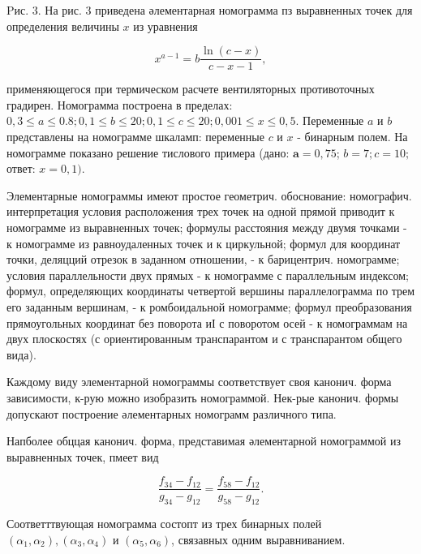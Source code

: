 \documentclass[10pt]{article}
\begin{document}
Pис. 3. На рис. 3 приведена әлементарная номограмма пз выравненных точек для определения величины $x$ из уравнения



\[

x^{a-1}=b \frac{\ln (c-x)}{c-x-1},

\]



применяющегося при термическом расчете вентиляторных противоточных градирен. Номограмма построена в пределах: $0,3 \leqslant a \leqslant 0.8 ; 0,1 \leqslant b \leqslant 20 ; 0,1 \leqslant c \leqslant 20 ; 0,001 \leqslant x \leqslant 0,5$. Переменные $a$ и $b$ представлены на номограмме шкаламп: переменные $c$ и $x$ - бинарным полем. На номограмме показано решение тислового примера (дано: $\boldsymbol{a}=0,75$; $b=7 ; c=10 ;$ ответ: $x=0,1)$.



Элементарные номограммы имеют простое геометрич. обоснование: номографич. интерпретация условия расположения трех точек на одной прямой приводит к номограмме из выравненных точек; формулы расстояния между двумя точками - к номограмме из равноудаленных точек и к циркульной; формул для координат точки, деляцций отрезок в заданном отношении, - к барицентрич. номограмме; условия параллельности двух прямых - к номограмме с параллельным индексом; формул, определяющих координаты четвертой вершины параллелограмма по трем его заданным вершинам, - к ромбоидальной номограмме; формул преобразования прямоугольных координат без поворота иІ с поворотом осей - к номограммам на двух плоскостях (с ориентированным транспарантом и с транспарантом общего вида).



Каждому виду элементарной номограммы соответствует своя канонич. форма зависимости, к-рую можно изобразить номограммой. Нек-рые канонич. формы допускают построение әлементарных номограмм различного типа.



Напболее обццая канонич. форма, представимая әлементарной номограммой из выравненных точек, пмеет вид



\[

\frac{f_{34}-f_{12}}{g_{34}-g_{12}}=\frac{f_{58}-f_{12}}{g_{58}-g_{12}} .

\]



Соответттвующая номограмма состопт из трех бинарных полей $\left(\alpha_{1}, \alpha_{2}\right),\left(\alpha_{3}, \alpha_{4}\right)$ и $\left(\alpha_{5}, \alpha_{6}\right)$, связавных одним выравниванием.
\end{document}
